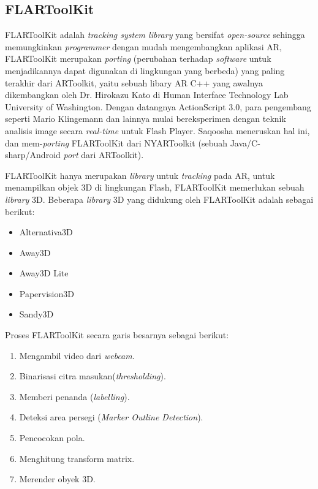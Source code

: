 \subsection {FLARToolKit}
\label {subsec:FLARToolKit}

FLARToolKit adalah \textit{tracking system library} yang bersifat \textit{open-source} sehingga memungkinkan \textit{programmer} dengan mudah mengembangkan aplikasi AR, FLARToolKit merupakan \textit{porting} (perubahan terhadap \textit{software} untuk menjadikannya dapat digunakan di lingkungan yang berbeda) yang paling terakhir dari ARToolkit, yaitu sebuah libary AR C++ yang awalnya dikembangkan oleh Dr. Hirokazu Kato di  Human Interface Technology Lab University of Washington. Dengan datangnya ActionScript 3.0, para pengembang seperti Mario Klingemann dan lainnya mulai bereksperimen dengan teknik analisis image secara \textit{real-time} untuk  Flash Player. Saqoosha meneruskan hal ini, dan mem-\textit{porting} FLARToolKit dari NYARToolkit (sebuah Java/C-sharp/Android \textit{port} dari ARToolkit).

FLARToolKit hanya merupakan \textit{library} untuk \textit{tracking} pada AR, untuk menampilkan objek 3D di lingkungan Flash, FLARToolKit memerlukan sebuah \textit{library} 3D. Beberapa \textit{library} 3D yang didukung oleh FLARToolKit adalah sebagai berikut:
\begin{itemize}
\item Alternativa3D
\item Away3D
\item Away3D Lite
\item Papervision3D
\item Sandy3D
\end{itemize}

Proses FLARToolKit secara garis besarnya sebagai berikut: 

\begin{enumerate}
	\item Mengambil video dari \textit{webcam}.
	\item Binarisasi citra masukan(\textit{thresholding}).
	\item Memberi penanda (\textit{labelling}).
	\item Deteksi area persegi (\textit{Marker Outline Detection}). 
	\item Pencocokan pola.
	\item Menghitung transform matrix.
	\item Merender obyek 3D.
\end{enumerate}

